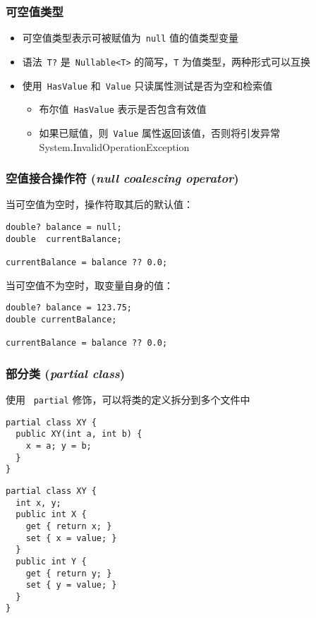 \begin{frame}[fragile]
\frametitle{可空值类型}
\begin{itemize}
\item 可空值类型表示可被赋值为~\texttt{null} 值的值类型变量
\item 语法~\texttt{T?} 是~\lstinline|Nullable<T>| 的简写，\texttt{T} 为值类型，两种形式可以互换
\item 使用~\texttt{HasValue} 和~\texttt{Value} 只读属性测试是否为空和检索值
\begin{itemize}
\item 布尔值~\texttt{HasValue} 表示是否包含有效值
\item 如果已赋值，则~\texttt{Value} 属性返回该值，否则将引发异常 System.InvalidOperationException 
\end{itemize}
\end{itemize}
\end{frame}

\begin{frame}[fragile]
\frametitle{空值接合操作符 (\textit{null coalescing operator})}
当可空值为空时，操作符取其后的默认值：
\begin{lstlisting}
double? balance = null;
double  currentBalance;

currentBalance = balance ?? 0.0;
\end{lstlisting}

当可空值不为空时，取变量自身的值：
\begin{lstlisting}
double? balance = 123.75;
double currentBalance;

currentBalance = balance ?? 0.0;
\end{lstlisting}
\end{frame}

\begin{frame}[fragile]
\frametitle{部分类 (\textit{partial class})}
使用 ~\texttt{partial} 修饰，可以将类的定义拆分到多个文件中
\begin{lstlisting}
partial class XY {
  public XY(int a, int b) {
    x = a; y = b;
  }
}
\end{lstlisting}
\begin{lstlisting}
partial class XY {
  int x, y;
  public int X {
    get { return x; }
    set { x = value; }
  }
  public int Y {
    get { return y; }
    set { y = value; }
  }
}

\end{lstlisting}
\end{frame}

